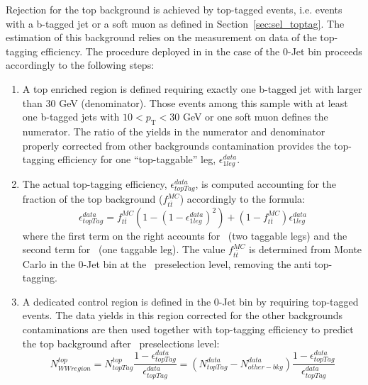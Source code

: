 Rejection for the top background is achieved by top-tagged events,
i.e. events with a b-tagged jet or a soft muon as defined in
Section~\ref{sec:sel_toptag}.  The estimation of this background
relies on the measurement on data of the top-tagging efficiency.  The
procedure deployed in \cite{HWW2011} in the case of the 0-Jet bin
proceeds accordingly to the following steps:
\begin{enumerate}
\item 
A top enriched region is defined requiring exactly one b-tagged jet
with \pt larger than $30$ GeV (denominator).  Those events among this
sample with at least one b-tagged jets with
$10<\ensuremath{p_\mathrm{T}}<30$ GeV or one soft muon defines the
numerator. The ratio of the yields in the numerator and denominator
properly corrected from other backgrounds contamination provides the
top-tagging efficiency for one ``top-taggable'' leg,
$\epsilon_{1leg}^{data}$.
\item 
The actual top-tagging efficiency, $\epsilon_{topTag}^{data}$, is
computed accounting for the \ttbar fraction of the top background
($f_{t\bar{t}}^{MC}$) accordingly to the formula:
\begin{equation} \label{eq:oldTopTagEff}
\epsilon_{topTag}^{data} = f_{t\bar{t}}^{MC}(1-(1-\epsilon_{1leg}^{data})^2) + (1-f_{t\bar{t}}^{MC})\epsilon_{1leg}^{data}
\end{equation} 
where the first term on the right accounts for \ttbar\ (two taggable
legs) and the second term for \tw\ (one taggable leg). The value
$f_{t\bar{t}}^{MC}$ is determined from Monte Carlo in the 0-Jet bin at
the \WW\ preselection level, removing the anti top-tagging.
\item 
A dedicated control region is defined in the 0-Jet bin by requiring
top-tagged events.  The data yields in this region corrected for the
other backgrounds contaminations are then used together with
top-tagging efficiency to predict the top background after \WW\
preselections level:
\begin{equation} \label{eq:topExtrapolation}
N^{top}_{WW region}=N_{topTag}^{top}\frac{1-\epsilon_{topTag}^{data}}{\epsilon_{topTag}^{data}} = 
(N_{topTag}^{data}-N_{other-bkg}^{data})\frac{1-\epsilon_{topTag}^{data}}{\epsilon_{topTag}^{data}}
\end{equation} 
\end{enumerate} 

